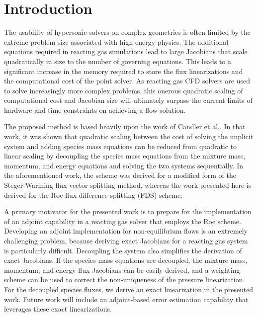 \chapter{Introduction}
\label{chapter-two}

The usability of hypersonic solvers on complex geometries is often limited by
the extreme problem size associated with high energy physics.  The additional
equations required in reacting gas simulations lead to large Jacobians that
scale quadratically in size to the number of governing equations.  This leads
to a significant increase in the memory required to store the flux
linearizations and the computational cost of the point solver.  As reacting gas
CFD solvers are used to solve increasingly more complex problems, this onerous
quadratic scaling of computational cost and Jacobian size will ultimately
surpass the current limits of hardware and time constraints on achieving a flow
solution\cite{fischer}.

The proposed method is based heavily upon the work of Candler et
al.\cite{candler}. In that work, it was shown that quadratic scaling between the
cost of solving the implicit system and adding species mass equations can be
reduced from quadratic to linear scaling by decoupling the species mass
equations from the mixture mass, momentum, and energy equations and solving the
two systems sequentially.  In the aforementioned work, the scheme was derived
for a modified form of the Steger-Warming flux vector splitting
method\cite{MacCormack}, whereas the work presented here is derived for the Roe
flux difference splitting (FDS) scheme\cite{roe}.

A primary motivator for the presented work is to prepare for the implementation
of an adjoint capability in a reacting gas solver that employs the Roe scheme.
Developing an adjoint implementation for non-equilibrium flows is an extremely
challenging problem, because deriving exact Jacobians for a reacting gas system
is particularly difficult.  Decoupling the system also simplifies the derivation
of exact Jacobians.  If the species mass equations are decoupled, the mixture mass,
momentum, and energy flux Jacobians can be easily derived\cite{Nishikawa}, and a
weighting scheme can be used to correct the non-uniqueness of the pressure
linearization\cite{Shuen}.  For the decoupled species fluxes, we derive an exact
linearization in the presented work.  Future work will include an adjoint-based
error estimation capability that leverages these exact linearizations.

